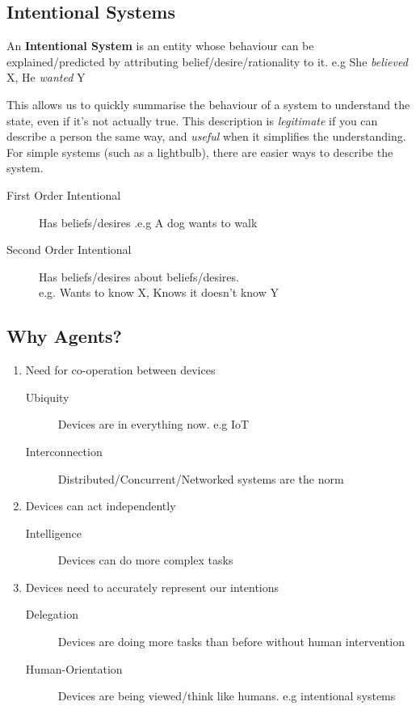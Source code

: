 \subsection{Intentional Systems}
An \textbf{Intentional System} is an entity whose behaviour can be explained/predicted by attributing belief/desire/rationality to it. e.g She \emph{believed} X, He \emph{wanted} Y

This allows us to quickly summarise the behaviour of a system to understand the state, even if it's not actually true. This description is \emph{legitimate} if you can describe a person the same way, and \emph{useful} when it simplifies the understanding. For simple systems (such as a lightbulb), there are easier ways to describe the system. 

\begin{description}
    \item [First Order Intentional] Has beliefs/desires .e.g A dog wants to walk
    \item[Second Order Intentional] Has beliefs/desires about beliefs/desires. \\ e.g. Wants to know X, Knows it doesn't know Y
\end{description}

\subsection{Why Agents?}

\begin{enumerate}
    \item Need for co-operation between devices
    \begin{description}
        \item [Ubiquity] Devices are in everything now. e.g IoT
        \item [Interconnection] Distributed/Concurrent/Networked systems are the norm 
    \end{description}
    \item Devices can act independently
    \begin{description}
        \item[Intelligence] Devices can do more complex tasks
    \end{description}
    \item Devices need to accurately represent our intentions
    \begin{description}
        \item[Delegation] Devices are doing more tasks than before without human intervention
        \item[Human-Orientation] Devices are being viewed/think like humans. e.g intentional systems
    \end{description}
\end{enumerate}

